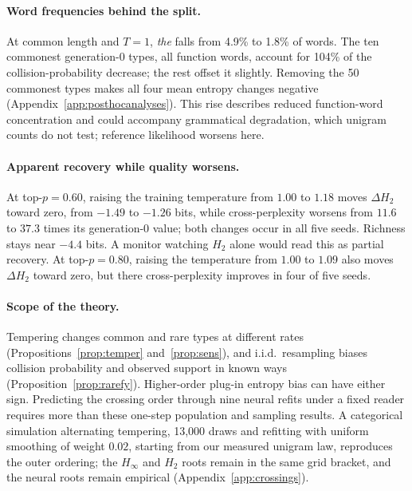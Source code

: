 \documentclass[10pt]{article}
\theoremstyle{plain}
\theoremstyle{definition}
\newcommand{\Htwo}{H_2}
\newcommand{\Hinf}{H_\infty}
\begin{document}
\paragraph{Word frequencies behind the split.} At common length and $T=1$, \emph{the} falls from
4.9\% to 1.8\% of words. The ten commonest generation-0 types, all function words, account
for 104\% of the collision-probability decrease; the rest offset it slightly. Removing the
50 commonest types makes all four mean entropy changes negative
(Appendix~\ref{app:posthocanalyses}). This rise describes reduced function-word concentration
and could accompany grammatical degradation, which unigram counts do not test; reference
likelihood worsens here.

\paragraph{Apparent recovery while quality worsens.} At top-$p=0.60$, raising the training
temperature from $1.00$ to $1.18$ moves $\Delta\Htwo$ toward zero, from $-1.49$ to $-1.26$
bits, while cross-perplexity worsens from $11.6$ to $37.3$ times its generation-0 value; both
changes occur in all five seeds. Richness stays near $-4.4$ bits. A monitor watching $\Htwo$
alone would read this as partial recovery. At top-$p=0.80$, raising the temperature from $1.00$ to $1.09$ also moves $\Delta\Htwo$ toward zero, but there
cross-perplexity improves in four of five seeds.

\paragraph{Scope of the theory.} Tempering changes common and rare types at
different rates (Propositions~\ref{prop:temper} and~\ref{prop:sens}), and i.i.d.\ resampling
biases collision probability and observed support in known ways (Proposition~\ref{prop:rarefy}).
Higher-order plug-in entropy bias can have either sign. Predicting the crossing order through
nine neural refits under a fixed reader requires more than these one-step population and
sampling results. A
categorical simulation alternating tempering, 13,000 draws and refitting with uniform
smoothing of weight $0.02$, starting from our
measured unigram law, reproduces the outer ordering; the $\Hinf$ and $\Htwo$ roots remain in
the same grid bracket, and the neural roots remain empirical (Appendix~\ref{app:crossings}).
\end{document}
